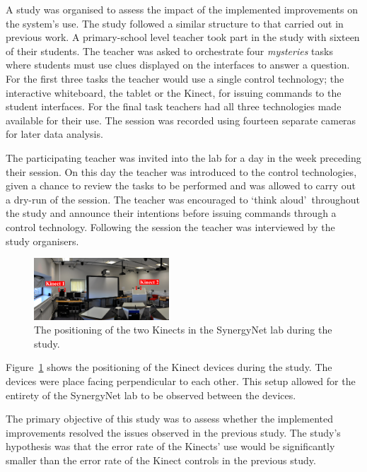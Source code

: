 \documentclass[manuscript, review, screen]{acmart}
\begin{document}
A study was organised to assess the impact of the implemented improvements on the system's use.
The study followed a similar structure to that carried out in previous work.
A primary-school level teacher took part in the study with sixteen of their students.
The teacher was asked to orchestrate four \textit{mysteries} tasks~\cite{AlAgha2010} where students must use clues displayed on the interfaces to answer a question.
For the first three tasks the teacher would use a single control technology; the interactive whiteboard, the tablet or the Kinect, for issuing commands to the student interfaces.
For the final task teachers had all three technologies made available for their use.
The session was recorded using fourteen separate cameras for later data analysis.

The participating teacher was invited into the lab for a day in the week preceding their session.
On this day the teacher was introduced to the control technologies, given a chance to review the tasks to be performed and was allowed to carry out a dry-run of the session.
The teacher was encouraged to \lq think aloud\rq\ throughout the study and announce their intentions before issuing commands through a control technology.
Following the session the teacher was interviewed by the study organisers.

\begin{figure}[h]
  \centering
  \includegraphics[width=0.45\textwidth]{figures/multiple_kinect_setup.png}
  \caption{The positioning of the two Kinects in the SynergyNet lab during the study.}
  \label{fig:kinectSetup}
\end{figure}

Figure~\ref{fig:kinectSetup} shows the positioning of the Kinect devices during the study.
The devices were place facing perpendicular to each other.
This setup allowed for the entirety of the SynergyNet lab to be observed between the devices.

The primary objective of this study was to assess whether the implemented improvements resolved the issues observed in the previous study.
The study's hypothesis was that the error rate of the Kinects' use would be significantly smaller than the error rate of the Kinect controls in the previous study.
\end{document}
